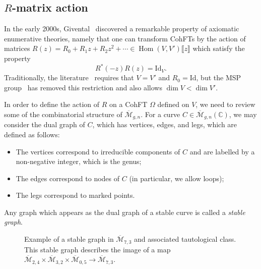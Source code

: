 \documentclass[10pt,oldfontcommands,oneside]{memoir}
\theoremstyle{definition}
\theoremstyle{remark}
\theoremstyle{plain}
\theoremstyle{definition}
\theoremstyle{remark}
\newcommand{\C}{\mathbb{C}}
\newcommand{\Mbar}{\overline{\mathcal{M}}}
\newcommand{\mc}[1]{\mathcal{#1}}
\newcommand{\mr}[1]{\mathrm{#1}}
\newcommand{\ol}[1]{\overline{#1}}
\newcommand{\1}{\mathbf{1}}
\newcommand{\2}{\mathbf{2}}
\newcommand{\3}{\mathbf{3}}
\newcommand{\ps}[1]{\llbracket #1 \rrbracket}
\DeclareMathOperator{\Hom}{Hom}
\begin{document}
\subsection{$R$-matrix action}%
\label{sub:R-matrix action}

In the early 2000s, Givental~\cite{virasorofanotoric,symplfrob} discovered a remarkable property of axiomatic enumerative theories, namely that one can transform CohFTs by the action of matrices $R(z) = R_0 + R_1 z + R_2 z^2 + \cdots \in \Hom(V, V')\ps{z}$ which satisfy the property
\[ R^*(-z) R(z) = \mr{Id}_V. \]
Traditionally, the literature~\cite{relationsvia3spin} requires that $V = V'$ and $R_0 = \mr{Id}$, but the MSP group~\cite{nmsp3} has removed this restriction and also allows $\dim V < \dim V'$.

In order to define the action of $R$ on a CohFT $\Omega$ defined on $V$, we need to review some of the combinatorial structure of $\Mbar_{g,n}$. For a curve $C\in \Mbar_{g,n}(\C)$, we may consider the dual graph of $C$, which has vertices, edges, and legs, which are defined as follows:
\begin{itemize}
    \item The vertices correspond to irreducible components of $C$ and are labelled by a non-negative integer, which is the genus;
    \item The edges correspond to nodes of $C$ (in particular, we allow loops);
    \item The legs correspond to marked points.
\end{itemize}
Any graph which appears as the dual graph of a stable curve is called a \textit{stable graph}.

\begin{figure}[htpb]
  \centering
  \caption{Example of a stable graph in $\ol{\mc{M}}_{7,3}$ and associated tautological class. This stable graph describes the image of a map
    $\ol{\mc{M}}_{2,4} \times \ol{\mc{M}}_{3,2} \times \ol{\mc{M}}_{0,5} \to \ol{\mc{M}}_{7,3}$.}
  \label{fig:stablegraph}
\end{figure}
\end{document}
